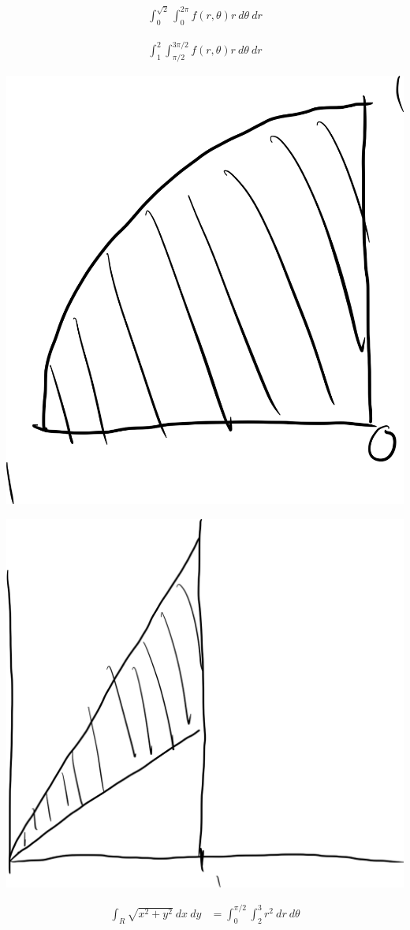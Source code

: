 \documentclass[10pt]{extarticle}
\begin{document}
  \begin{problem}{16.4}
    \begin{description}[font=\normalfont]
      \item[2:]
        \begin{align*}
          \int_{0}^{\sqrt{2}}\int_{0}^{2\pi}f(r,\theta)r~d\theta~dr
        \end{align*}
      \item[4:]
        \begin{align*}
          \int_{1}^{2}\int_{\pi/2}^{3\pi/2}f(r,\theta)r~d\theta~dr
        \end{align*}
      \item[10:]\hfill
        \begin{center}
          \includegraphics[height=0.5\textwidth]{images/16_4_10.png}
        \end{center}
      \item[12:]\hfill
        \begin{center}
          \includegraphics[height=0.5\textwidth]{images/16_4_12.png}
        \end{center}
      \item[16:]
        \begin{align*}
          \int_{R}\sqrt{x^2 + y^2}~dx~dy &= \int_{0}^{\pi/2}\int_{2}^{3}r^2~dr~d\theta\\

\end{align*}
\end{description}
\end{problem}
\end{document}
